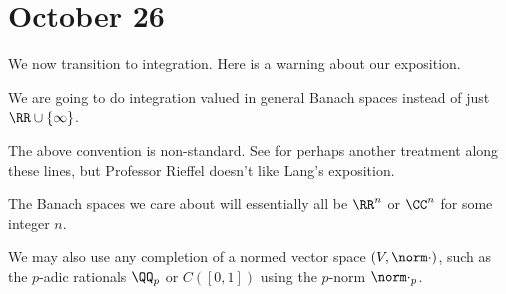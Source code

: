 \documentclass[../notes.tex]{subfiles}
\begin{document}
\section{October 26}

We now transition to integration. Here is a warning about our exposition.
\begin{warn}
	We are going to do integration valued in general Banach spaces instead of just $\RR\cup\{\infty\}$.
\end{warn}
The above convention is non-standard. See \cite{lang-analysis} for perhaps another treatment along these lines, but Professor Rieffel doesn't like Lang's exposition.
\begin{example}
	The Banach spaces we care about will essentially all be $\RR^n$ or $\CC^n$ for some integer $n$.
\end{example}
\begin{example}
	We may also use any completion of a normed vector space $(V,\norm\cdot)$, such as the $p$-adic rationals $\QQ_p$ or $C([0,1])$ using the $p$-norm $\norm\cdot_p$.
\end{example}
\end{document}
